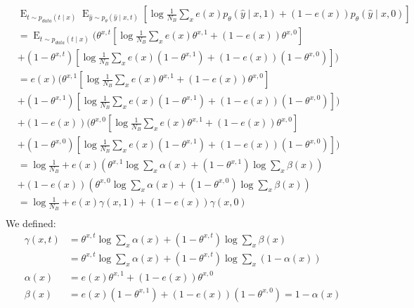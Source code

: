 \documentclass[oneside,12pt]{article}
\begin{document}
\begin{equation}
    \begin{split}
        &\operatorname{E}_{t \sim p_{data}(t \mid x)}
        \operatorname{E}_{\hat{y} \sim p_\theta(\hat{y} \mid x,t)}
        \left[\operatorname{log}\frac{1}{N_B}\sum_x e(x)p_\theta(\hat{y} \mid x,1) + (1-e(x))p_\theta(\hat{y} \mid x,0)\right]\\
        &= \operatorname{E}_{t \sim p_{data}(t \mid x)}
        (\theta^{x,t}\left[\operatorname{log}\frac{1}{N_B}\sum_x e(x)\theta^{x,1} + (1-e(x))\theta^{x,0}\right]\\
        &+ (1-\theta^{x,t})\left[\operatorname{log}\frac{1}{N_B}\sum_x e(x)(1-\theta^{x,1}) + (1-e(x))(1-\theta^{x,0})\right])\\
        &= e(x)
        (\theta^{x,1}\left[\operatorname{log}\frac{1}{N_B}\sum_x e(x)\theta^{x,1} + (1-e(x))\theta^{x,0}\right]\\
        &+ (1-\theta^{x,1})\left[\operatorname{log}\frac{1}{N_B}\sum_x e(x)(1-\theta^{x,1}) + (1-e(x))(1-\theta^{x,0})\right])\\
        &+ (1-e(x))(\theta^{x,0}\left[\operatorname{log}\frac{1}{N_B}\sum_x e(x)\theta^{x,1} + (1-e(x))\theta^{x,0}\right]\\
        &+ (1-\theta^{x,0})\left[\operatorname{log}\frac{1}{N_B}\sum_x e(x)(1-\theta^{x,1}) + (1-e(x))(1-\theta^{x,0})\right])\\
        &= \operatorname{log}\frac{1}{N_B} + e(x)
        \left(\theta^{x,1}\operatorname{log}\sum_x \alpha(x)
        + (1-\theta^{x,1})\operatorname{log}\sum_x \beta(x)\right)\\
        &+ (1-e(x))\left(\theta^{x,0}\operatorname{log}\sum_x \alpha(x)
        + (1-\theta^{x,0})\operatorname{log}\sum_x \beta(x)\right)\\
        &= \operatorname{log}\frac{1}{N_B} + e(x)
        \gamma(x,1) + (1-e(x))\gamma(x,0)\\
    \end{split}
\end{equation}
%
We defined:
\begin{equation}
    \begin{split}
        \gamma(x,t) &= \theta^{x,t}\operatorname{log}\sum_x \alpha(x)
        + (1-\theta^{x,t})\operatorname{log}\sum_x \beta(x)\\
        &= \theta^{x,t}\operatorname{log}\sum_x \alpha(x)
        + (1-\theta^{x,t})\operatorname{log}\sum_x (1 - \alpha(x))\\
        \alpha(x) &= e(x)\theta^{x,1} + (1-e(x))\theta^{x,0}\\
        \beta(x) &= e(x)(1-\theta^{x,1}) + (1-e(x))(1-\theta^{x,0}) = 1 - \alpha(x)
    \end{split}
\end{equation}
\end{document}
